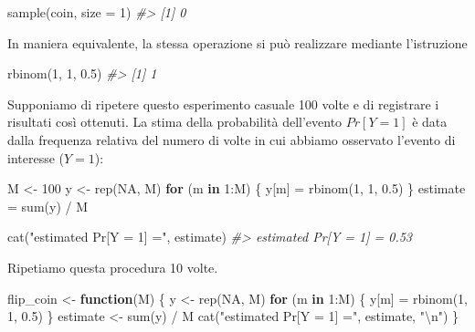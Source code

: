 \documentclass[
  11pt,
]{krantz}
\makeatletter
\newenvironment{Shaded}{\begin{snugshade}}{\end{snugshade}}
\newcommand{\AttributeTok}[1]{\textcolor[rgb]{0.61,0.61,0.61}{#1}}
\newcommand{\CommentTok}[1]{\textcolor[rgb]{0.37,0.37,0.37}{\textit{#1}}}
\newcommand{\ConstantTok}[1]{\textcolor[rgb]{0,0,0}{#1}}
\newcommand{\ControlFlowTok}[1]{\textcolor[rgb]{0.27,0.27,0.27}{\textbf{#1}}}
\newcommand{\DecValTok}[1]{\textcolor[rgb]{0.06,0.06,0.06}{#1}}
\newcommand{\FloatTok}[1]{\textcolor[rgb]{0.06,0.06,0.06}{#1}}
\newcommand{\FunctionTok}[1]{\textcolor[rgb]{0,0,0}{#1}}
\newcommand{\NormalTok}[1]{#1}
\newcommand{\OtherTok}[1]{\textcolor[rgb]{0.37,0.37,0.37}{#1}}
\newcommand{\SpecialCharTok}[1]{\textcolor[rgb]{0,0,0}{#1}}
\newcommand{\StringTok}[1]{\textcolor[rgb]{0.5,0.5,0.5}{#1}}
\newenvironment{kframe}{%
\medskip{}
\setlength{\fboxsep}{.8em}
 \def\at@end@of@kframe{}%
 \ifinner\ifhmode%
  \def\at@end@of@kframe{\end{minipage}}%
  \begin{minipage}{\columnwidth}%
 \fi\fi%
 \def\FrameCommand##1{\hskip\@totalleftmargin \hskip-\fboxsep
 \colorbox{shadecolor}{##1}\hskip-\fboxsep
     \hskip-\linewidth \hskip-\@totalleftmargin \hskip\columnwidth}%
 \MakeFramed {\advance\hsize-\width
   \@totalleftmargin\z@ \linewidth\hsize
   \@setminipage}}%
 {\par\unskip\endMakeFramed%
 \at@end@of@kframe}
\renewenvironment{Shaded}{\begin{kframe}}{\end{kframe}}
\theoremstyle{definition}
\theoremstyle{definition}
\theoremstyle{definition}
\theoremstyle{definition}
\theoremstyle{remark}
\makeatother
\begin{document}
\begin{Shaded}
\begin{Highlighting}[]
\FunctionTok{sample}\NormalTok{(coin, }\AttributeTok{size =} \DecValTok{1}\NormalTok{)}
\CommentTok{\#\textgreater{} [1] 0}
\end{Highlighting}
\end{Shaded}

\noindent In maniera equivalente, la stessa operazione si può realizzare mediante l'istruzione

\begin{Shaded}
\begin{Highlighting}[]
\FunctionTok{rbinom}\NormalTok{(}\DecValTok{1}\NormalTok{, }\DecValTok{1}\NormalTok{, }\FloatTok{0.5}\NormalTok{)}
\CommentTok{\#\textgreater{} [1] 1}
\end{Highlighting}
\end{Shaded}

Supponiamo di ripetere questo esperimento casuale 100 volte e di registrare i risultati così ottenuti. La stima della probabilità dell'evento \(Pr[Y = 1]\) è data dalla frequenza relativa del numero di volte in cui abbiamo osservato l'evento di interesse (\(Y = 1\)):

\begin{Shaded}
\begin{Highlighting}[]
\NormalTok{M }\OtherTok{\textless{}{-}} \DecValTok{100}
\NormalTok{y }\OtherTok{\textless{}{-}} \FunctionTok{rep}\NormalTok{(}\ConstantTok{NA}\NormalTok{, M)}
\ControlFlowTok{for}\NormalTok{ (m }\ControlFlowTok{in} \DecValTok{1}\SpecialCharTok{:}\NormalTok{M) \{}
\NormalTok{  y[m] }\OtherTok{=} \FunctionTok{rbinom}\NormalTok{(}\DecValTok{1}\NormalTok{, }\DecValTok{1}\NormalTok{, }\FloatTok{0.5}\NormalTok{)}
\NormalTok{\}}
\NormalTok{estimate }\OtherTok{=} \FunctionTok{sum}\NormalTok{(y) }\SpecialCharTok{/}\NormalTok{ M}

\FunctionTok{cat}\NormalTok{(}\StringTok{"estimated Pr[Y = 1] ="}\NormalTok{, estimate)}
\CommentTok{\#\textgreater{} estimated Pr[Y = 1] = 0.53}
\end{Highlighting}
\end{Shaded}

Ripetiamo questa procedura 10 volte.

\begin{Shaded}
\begin{Highlighting}[]
\NormalTok{flip\_coin }\OtherTok{\textless{}{-}} \ControlFlowTok{function}\NormalTok{(M) \{}
\NormalTok{  y }\OtherTok{\textless{}{-}} \FunctionTok{rep}\NormalTok{(}\ConstantTok{NA}\NormalTok{, M)}
  \ControlFlowTok{for}\NormalTok{ (m }\ControlFlowTok{in} \DecValTok{1}\SpecialCharTok{:}\NormalTok{M) \{}
\NormalTok{    y[m] }\OtherTok{=} \FunctionTok{rbinom}\NormalTok{(}\DecValTok{1}\NormalTok{, }\DecValTok{1}\NormalTok{, }\FloatTok{0.5}\NormalTok{)}
\NormalTok{  \}}
\NormalTok{  estimate }\OtherTok{\textless{}{-}} \FunctionTok{sum}\NormalTok{(y) }\SpecialCharTok{/}\NormalTok{ M}
  \FunctionTok{cat}\NormalTok{(}\StringTok{"estimated Pr[Y = 1] ="}\NormalTok{, estimate, }\StringTok{"}\SpecialCharTok{\textbackslash{}n}\StringTok{"}\NormalTok{)}
\NormalTok{\}}
\end{Highlighting}
\end{Shaded}
\end{document}
